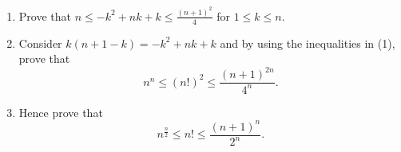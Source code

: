 \begin{problems}
    \problem
    \begin{enumerate}
        \item Prove that $n \leq -k^2 + nk + k \leq \frac{(n + 1)^2}{4}$ for $1
            \leq k \leq n$. 
        
        \item Consider $k(n + 1 - k) = -k^2 + nk + k$ and by using the
            inequalities in (1), prove that \[n^n \leq (n!)^2 \leq \frac{(n +
            1)^{2n}}{4^n}.\]
        
        \item Hence prove that \[n^{\frac{n}{2}} \leq n! \leq \frac{(n +
            1)^n}{2^n}.\]
    \end{enumerate}
\end{problems}
